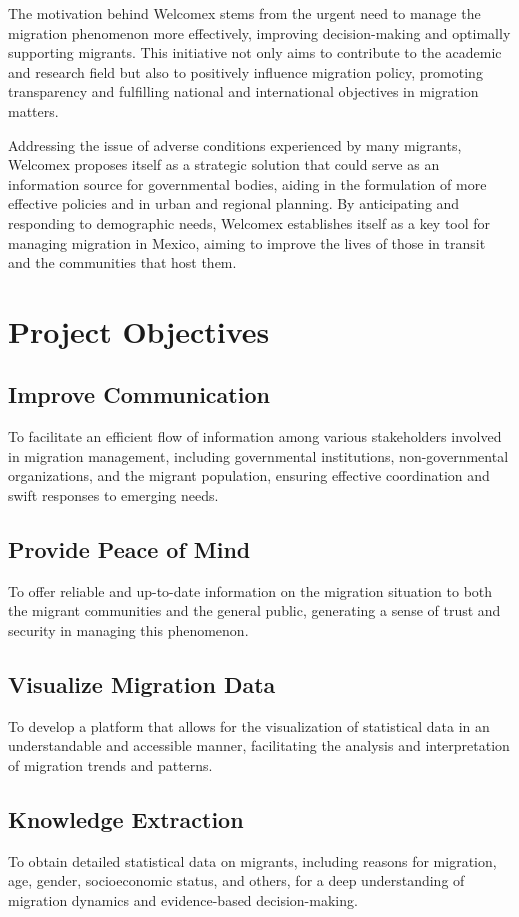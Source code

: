 \documentclass[conference]{IEEEtran}
\begin{document}
The motivation behind Welcomex stems from the urgent need to manage the migration phenomenon more effectively, improving decision-making and optimally supporting migrants. This initiative not only aims to contribute to the academic and research field but also to positively influence migration policy, promoting transparency and fulfilling national and international objectives in migration matters.

Addressing the issue of adverse conditions experienced by many migrants, Welcomex proposes itself as a strategic solution that could serve as an information source for governmental bodies, aiding in the formulation of more effective policies and in urban and regional planning. By anticipating and responding to demographic needs, Welcomex establishes itself as a key tool for managing migration in Mexico, aiming to improve the lives of those in transit and the communities that host them.


\section{Project Objectives}
\subsection{Improve Communication}
To facilitate an efficient flow of information among various stakeholders involved in migration management, including governmental institutions, non-governmental organizations, and the migrant population, ensuring effective coordination and swift responses to emerging needs.

\subsection{Provide Peace of Mind}
To offer reliable and up-to-date information on the migration situation to both the migrant communities and the general public, generating a sense of trust and security in managing this phenomenon.

\subsection{Visualize Migration Data}
To develop a platform that allows for the visualization of statistical data in an understandable and accessible manner, facilitating the analysis and interpretation of migration trends and patterns.

\subsection{Knowledge Extraction}
To obtain detailed statistical data on migrants, including reasons for migration, age, gender, socioeconomic status, and others, for a deep understanding of migration dynamics and evidence-based decision-making.
\end{document}

